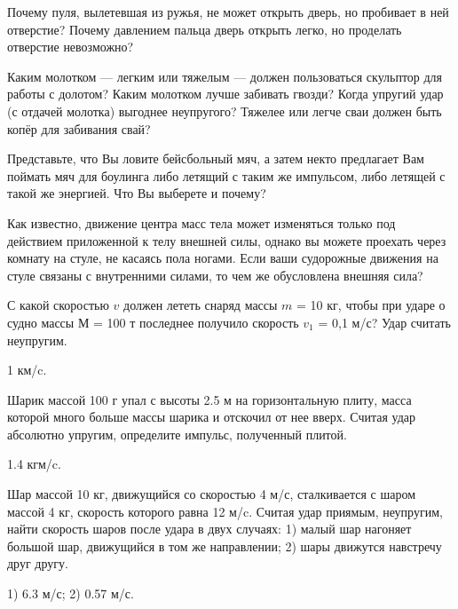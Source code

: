 \qualProblems

\begin{ex}
Почему пуля, вылетевшая из ружья, не может открыть дверь, но пробивает в ней отверстие? Почему давлением пальца  дверь открыть легко, но проделать отверстие невозможно?
\end{ex}

\begin{ex}
Каким молотком — легким или тяжелым — должен пользоваться скульптор для работы с долотом? Каким молотком лучше забивать гвозди? Когда упругий удар (с отдачей молотка) выгоднее неупругого? Тяжелее или легче сваи должен быть копёр для забивания свай?
\end{ex}

\begin{ex}
Представьте, что Вы ловите бейсбольный мяч, а затем некто предлагает Вам поймать мяч для боулинга либо летящий с таким же импульсом, либо летящей с такой же энергией. Что Вы выберете и почему?
\end{ex}

\begin{ex}
Как известно, движение центра масс тела может изменяться только под действием приложенной к телу внешней силы, однако вы можете проехать через комнату на стуле, не касаясь пола ногами. Если ваши судорожные движения на стуле связаны с внутренними силами, то чем же обусловлена внешняя сила?
\end{ex}

\simpleProblems

\begin{ex} %
С какой скоростью $v$ должен лететь снаряд массы $m$ = 10 кг, чтобы при ударе о судно массы $М$ = 100 т последнее получило скорость $v_1$ = 0,1 м/с? Удар считать неупругим.
\begin{ans}
1 км/c.
\end{ans}
\end{ex}

\begin{ex} %
Шарик  массой 100 г упал с высоты 2.5 м на горизонтальную плиту, масса которой много больше массы шарика и отскочил от нее вверх. Считая удар абсолютно упругим, определите импульс, полученный плитой.
\begin{ans}
1.4 кгм/c.
\end{ans}
\end{ex}

\begin{ex} %
Шар массой 10 кг, движущийся со скоростью 4 м/с, сталкивается с шаром массой 4 кг, скорость которого равна 12 м/c. Считая удар приямым, неупругим, найти скорость шаров после удара в двух случаях: 1) малый шар нагоняет большой шар, движущийся в том же направлении; 2) шары движутся навстречу друг другу.
\begin{ans}
1) 6.3 м/с; 2) 0.57 м/с.
\end{ans}
\end{ex}


